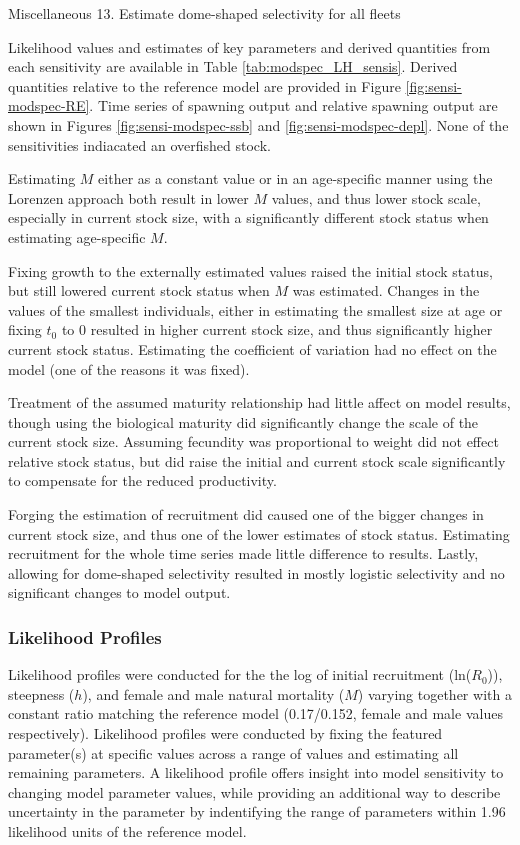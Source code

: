 \documentclass[11pt,
  english,
  letterpaper,
]{article}
\begin{document}
Miscellaneous 13. Estimate dome-shaped selectivity for all fleets

Likelihood values and estimates of key parameters and derived quantities from each sensitivity are available in Table \ref{tab:modspec_LH_sensis}. Derived quantities relative to the reference model are provided in Figure \ref{fig:sensi-modspec-RE}. Time series of spawning output and relative spawning output are shown in Figures \ref{fig:sensi-modspec-ssb} and \ref{fig:sensi-modspec-depl}. None of the sensitivities indiacated an overfished stock.

Estimating \(M\) either as a constant value or in an age-specific manner using the Lorenzen approach both result in lower \(M\) values, and thus lower stock scale, especially in current stock size, with a significantly different stock status when estimating age-specific \(M\).

Fixing growth to the externally estimated values raised the initial stock status, but still lowered current stock status when \(M\) was estimated. Changes in the values of the smallest individuals, either in estimating the smallest size at age or fixing \(t_0\) to 0 resulted in higher current stock size, and thus significantly higher current stock status. Estimating the coefficient of variation had no effect on the model (one of the reasons it was fixed).

Treatment of the assumed maturity relationship had little affect on model results, though using the biological maturity did significantly change the scale of the current stock size. Assuming fecundity was proportional to weight did not effect relative stock status, but did raise the initial and current stock scale significantly to compensate for the reduced productivity.

Forging the estimation of recruitment did caused one of the bigger changes in current stock size, and thus one of the lower estimates of stock status. Estimating recruitment for the whole time series made little difference to results. Lastly, allowing for dome-shaped selectivity resulted in mostly logistic selectivity and no significant changes to model output.

\hypertarget{likelihood-profiles}{%
\subsubsection{Likelihood Profiles}\label{likelihood-profiles}}

Likelihood profiles were conducted for the the log of initial recruitment (ln(\(R_0\))), steepness (\(h\)), and female and male natural mortality (\(M\)) varying together with a constant ratio matching the reference model (0.17/0.152, female and male values respectively). Likelihood profiles were conducted by fixing the featured parameter(s) at specific values across a range of values and estimating all remaining parameters. A likelihood profile offers insight into model sensitivity to changing model parameter values, while providing an additional way to describe uncertainty in the parameter by indentifying the range of parameters within 1.96 likelihood units of the reference model.
\end{document}
